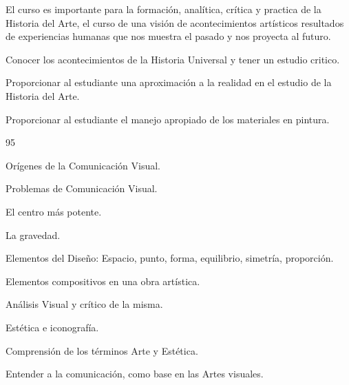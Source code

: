 \begin{syllabus}


\begin{justification}
El curso es importante para la formación, analítica, crítica y practica de la Historia del Arte, el curso de una visión de acontecimientos artísticos resultados de experiencias humanas que nos muestra el pasado y nos proyecta al futuro.
\end{justification}

\begin{goals}
\item Conocer los acontecimientos de la Historia Universal y tener un estudio critico.
\item Proporcionar al estudiante una aproximación a la realidad en el estudio de la Historia del Arte.
\item Proporcionar al estudiante el manejo apropiado de los materiales en pintura.
\end{goals}

\begin{outcomes}
\end{outcomes}

\begin{unit}{}{}{9}{5}
\begin{topics}
	\item Orígenes de la Comunicación Visual.
	\item Problemas de Comunicación Visual.
	\item El centro más potente.
	\item La gravedad.
	\item Elementos del Diseño: Espacio, punto, forma, equilibrio, simetría, proporción.
	\item Elementos compositivos en una obra artística.
	\item Análisis Visual y crítico de la misma.
	\item Estética e iconografía.
\end{topics}
\begin{learningoutcomes}
	\item Comprensión de los términos Arte y Estética.
	\item Entender a la comunicación, como base en las Artes visuales.

\end{learningoutcomes}
\end{unit}


\end{syllabus}

